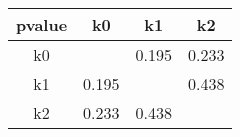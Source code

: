 \begin{tabular}{c|c|c|c} \hline
pvalue & k0 & k1 & k2 \\ \hline\hline
k0 &  & 0.195 & 0.233 \\ \hline
k1 & 0.195 &  & 0.438 \\ \hline
k2 & 0.233 & 0.438 &  \\ \hline
\end{tabular}
